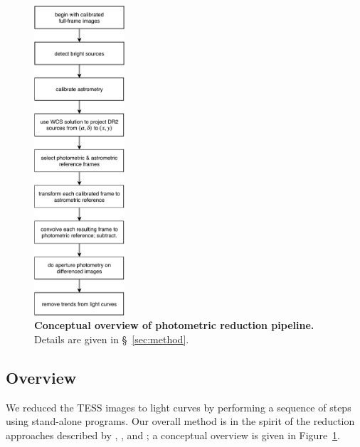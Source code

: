 \documentclass[12pt,twocolumn,tighten]{aastex62}
\begin{document}
\begin{figure}[t]
	\begin{center}
		\leavevmode
		\includegraphics[width=0.3\textwidth]{pipelineoverview.pdf}
	\end{center}
	\vspace{-0.2cm}
	\caption{
    {\bf Conceptual overview of photometric reduction pipeline.}
    Details are given in \S~\ref{sec:method}.
	\label{fig:pipeline}
	}
\end{figure}

\subsection{Overview}

We reduced the TESS images to light curves by performing a sequence of
steps using stand-alone programs.
Our overall method is in the spirit of the reduction approaches described
by \citet{Pal_2009}, \citet{huang_high-precision_2015}, \citet{soares-furtado_image_2017} and
\citet{oelkers_precision_2018}; a conceptual overview is given in
Figure~\ref{fig:pipeline}.
\end{document}
